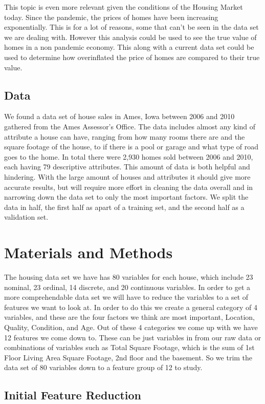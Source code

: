 \documentclass{article}
\begin{document}
	This topic is even more relevant given the conditions of the Housing Market today. Since the pandemic, the prices of homes have been increasing exponentially. This is for a lot of reasons, some that can't be seen in the data set we are dealing with. However this analysis could be used to see the true value of homes in a non pandemic economy. This along with a current data set could be used to determine how overinflated the price of homes are compared to their true value. 
	
	\subsection{Data}
	We found a data set of house sales in Ames, Iowa between 2006 and 2010 gathered from the Ames Assessor's Office. The data includes almost any kind of attribute a house can have, ranging from how many rooms there are and the square footage of the house, to if there is a pool or garage and what type of road goes to the home. In total there were 2,930 homes sold between 2006 and 2010, each having 79 descriptive attributes. This amount of data is both helpful and hindering. With the large amount of houses and attributes it should give more accurate results, but will require more effort in cleaning the data overall and in narrowing down the data set to only the most important factors. We split the data in half, the first half as apart of a training set, and the second half as a validation set. 
	
	
	\section{Materials and Methods}
	The housing data set we have has 80 variables for each house, which include 23 nominal, 23 ordinal, 14 discrete, and 20 continuous variables. In order to get a more comprehendable data set we will have to reduce the variables to a set of features we want to look at. In order to do this we create a general category of 4 variables, and these are the four factors we think are most important, Location, Quality, Condition, and Age. Out of these 4 categories we come up with we have 12 features we come down to. These can be just variables in from our raw data or combinations of variables such as Total Square Footage, which is the sum of 1st Floor Living Area Square Footage, 2nd floor and the basement. So we trim the data set of 80 variables down to a feature group of 12 to study.

	\subsection{Initial Feature Reduction}
\end{document}
